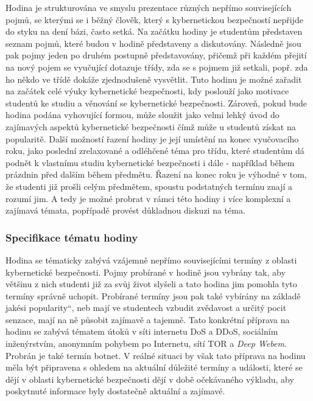 \documentclass[a4paper, 12pt]{article}
\providecommand{\uv}[1]{\quotedblbase #1\textquotedblleft}
\begin{document}
Hodina je strukturována ve smyslu prezentace různých nepřímo souvisejících pojmů, se kterými se i běžný člověk, který s kybernetickou bezpečností nepřijde do styku na dení bázi, často setká. Na začátku hodiny je studentům představen seznam pojmů, které budou v hodině představeny a diskutovány. Následně jsou pak pojmy jeden po druhém postupně představovány, přičemž při každém přejití na nový pojem se vyučující dotazuje třídy, zda se s pojmem již setkali, popř. zda ho někdo ve třídě dokáže zjednodušeně vysvětlit. Tuto hodinu je možné zařadit na začátek celé výuky kybernetické bezpečnosti, kdy poslouží jako motivace studentů ke studiu a věnování se kybernetické bezpečnosti. Zároveň, pokud bude hodina podána vyhovující formou, může sloužit jako velmi lehký úvod do zajímavých aspektů kybernetické bezpečnosti čímž může u studentů získat na popularitě. Další možností řazení hodiny je její umístění na konec vyučovacího roku, jako poslední zrelaxované a odléhčené téma pro třídu, které studentům dá podnět k vlastnímu studiu kybernetické bezpečnosti i dále - například během prázdnin před dalším během předmětu. Řazení na konec roku je výhodné v tom, že studenti již prošli celým předmětem, spoustu podstatných termínu znají a rozumí jim. A tedy je možné probrat v rámci této hodiny i více komplexní a zajímavá témata, popřípadě provést důkladnou diskuzi na téma.

\subsubsection{Specifikace tématu hodiny} 
Hodina se tématicky zabývá vzájemně nepřímo souvisejícími termíny z oblasti kybernetické bezpečnosti. Pojmy probírané v hodině jsou vybrány tak, aby většinu z nich studenti již za svůj život slyšeli a tato hodina jim pomohla tyto termíny správně uchopit. Probírané termíny jsou pak také vybírány na základě jakési \uv{popularity}, neb mají ve studentech vzbudit zvědavost a určitý pocit senzace, mají na ně působit zajímavě a tajemně. Tato konkrétní příprava na hodinu se zabývá tématem útoků v síti internetu DoS a DDoS, sociálním inženýrstvím, anonymním pohybem po Internetu, sítí TOR a \textit{Deep Webem}. Probrán je také termín botnet. V reálné situaci by však tato příprava na hodinu měla být připravena s ohledem na aktuální důležité termíny a události, které se dějí v oblasti kybernetické bezpečnosti dějí v době očekávaného výkladu, aby poskytnuté informace byly dostatečně aktuální a zajímavé.
\end{document}
